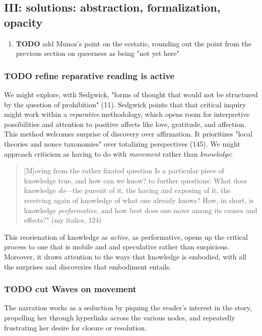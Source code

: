 \documentclass[11pt]{article}
\begin{document}
\subsection{III: solutions: abstraction, formalization, opacity}
\label{sec:org09f7e30}
\begin{enumerate}
\item {\bfseries\sffamily TODO} add Munoz's point on the ecstatic, rounding out the point
\label{sec:org0ac0a7d}
from the previous section on queerness as being "not yet here"
\end{enumerate}
\subsubsection{{\bfseries\sffamily TODO} refine reparative reading is active}
\label{sec:orgef88d60}

We might explore, with Sedgwick, "forms of thought that would not be
structured by the question of prohibition" (11). Sedgwick points that
that critical inquiry might work within a \emph{reparative} methodology,
which opens room for interpretive possibilities and attention to
positive affects like love, gratitude, and affection. This method
welcomes surprise of discovery over affirmation. It prioritizes "local
theories and nonce taxonomies" over totalizing perspectives (145). We
might approach criticism as having to do with \emph{movement} rather than
\emph{knowledge}:

\begin{quote}
[M]oving from the rather fixated question Is a particular piece of
knowledge true, and how can we know? to further questions: What does
knowledge \emph{do}---the pursuit of it, the having and exposing of it, the
receiving again of knowledge of what one already knows? How, in short,
is knowledge \emph{performative}, and how best does one move among its
causes and effects?" (my italics, 124)
\end{quote}

This reorienation of knowledge as \emph{active}, as performative, opens up
the critical process to one that is mobile and and speculative rather
than suspicious. Moreover, it draws attention to the ways that
knowledge is embodied, with all the surprises and discoveries that
embodiment entails. 
\subsubsection{{\bfseries\sffamily TODO} cut Waves on movement}
\label{sec:org4fa1885}
The narration works as a seduction by piquing the reader's interest in
the story, propelling her through hyperlinks across the various nodes,
and repeatedly frustrating her desire for closure or resolution.
\end{document}
